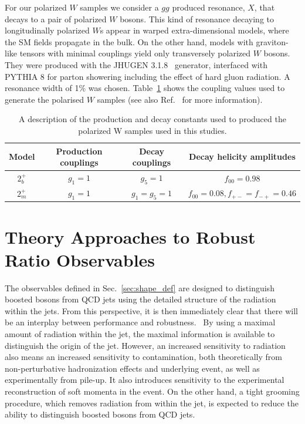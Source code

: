 \documentclass[11pt,letterpaper]{article}
\DeclareRobustCommand{\Sec}[1]{Sec.~\ref{#1}}
\DeclareRobustCommand{\Ref}[1]{Ref.~\cite{#1}}
\begin{document}
For our polarized $W$ samples we consider a $gg$ produced resonance, $X$, that decays to a pair of polarized $W$ bosons.
%
This kind of resonance decaying to longitudinally polarized $W$s appear in warped extra-dimensional models, where the SM fields propagate in the bulk.
%
On the other hand, models with graviton-like tensors with minimal couplings yield only transversely polarized $W$ bosons.
%
They were produced with the \textsc{JHUGEN} 3.1.8~\cite{Gao:2010qx,Bolognesi:2012mm} generator, interfaced with \textsc{PYTHIA} 8 \cite{Sjostrand:2007gs} for parton showering including the effect of hard gluon radiation.
%
%
A resonance width of 1\% was chosen.
%
Table~\ref{table:polarisedSamples} shows the coupling values used to generate the polarised $W$ samples (see also \Ref{Gao:2010qx} for more information). 

\begin{table}[ht]
\centering
\begin{tabular}{|c|c|c|c|}
\hline
Model	&Production couplings	&Decay couplings	&Decay helicity amplitudes 	\\
\hline
$2_b^+$	& $g_1=1$		& $g_5=1$		& $f_{00}=0.98$			\\
$2_m^+$	& $g_1=1$		& $g_1=g_5=1$		& $f_{00}=0.08,f_{+-}=f_{-+}=0.46$\\	
\hline
\end{tabular}
\caption{A description of the production and decay constants used to produced the polarized W samples used in this studies.}
\label{table:polarisedSamples}
\end{table}



\section{Theory Approaches to Robust Ratio Observables}\label{sec:hybrid_ratio}

The observables defined in \Sec{sec:shape_def} are designed to
distinguish boosted bosons from QCD jets using the detailed structure
of the radiation within the jets.
%
From this perspective, it is then
immediately clear that there will be an interplay between performance
and robustness.\
%
By using a maximal amount of radiation within the jet,
the maximal information is available to distinguish the origin of the
jet.
%
However, an increased sensitivity to radiation also means an
increased sensitivity to contamination, both theoretically from
non-perturbative hadronization effects and underlying event, as well
as experimentally from pile-up.
%
It also introduces sensitivity to the
experimental reconstruction of soft momenta in the event.
%
On the other
hand, a tight grooming procedure, which removes radiation from within
the jet, is expected to reduce the ability to distinguish boosted
bosons from QCD jets.
\end{document}
